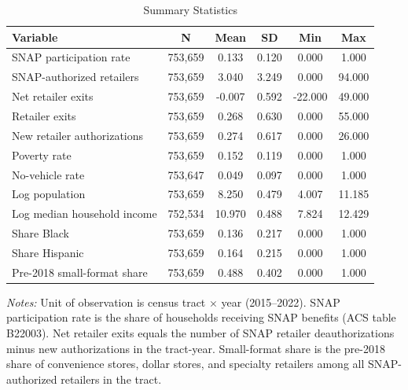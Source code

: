 \begin{table}[t]
\centering
\caption{Summary Statistics}
\label{tab:summary}
\begin{threeparttable}
\begin{tabular}{lccccc}
\toprule
Variable & N & Mean & SD & Min & Max \\
\midrule
  SNAP participation rate & 753,659 & 0.133 & 0.120 & 0.000 & 1.000 \\
  SNAP-authorized retailers & 753,659 & 3.040 & 3.249 & 0.000 & 94.000 \\
  Net retailer exits & 753,659 & -0.007 & 0.592 & -22.000 & 49.000 \\
  Retailer exits & 753,659 & 0.268 & 0.630 & 0.000 & 55.000 \\
  New retailer authorizations & 753,659 & 0.274 & 0.617 & 0.000 & 26.000 \\
  Poverty rate & 753,659 & 0.152 & 0.119 & 0.000 & 1.000 \\
  No-vehicle rate & 753,647 & 0.049 & 0.097 & 0.000 & 1.000 \\
  Log population & 753,659 & 8.250 & 0.479 & 4.007 & 11.185 \\
  Log median household income & 752,534 & 10.970 & 0.488 & 7.824 & 12.429 \\
  Share Black & 753,659 & 0.136 & 0.217 & 0.000 & 1.000 \\
  Share Hispanic & 753,659 & 0.164 & 0.215 & 0.000 & 1.000 \\
  Pre-2018 small-format share & 753,659 & 0.488 & 0.402 & 0.000 & 1.000 \\
\bottomrule
\end{tabular}
\begin{tablenotes}
\small
\item \textit{Notes:} Unit of observation is census tract $\times$ year (2015--2022). SNAP participation rate is the share of households receiving SNAP benefits (ACS table B22003). Net retailer exits equals the number of SNAP retailer deauthorizations minus new authorizations in the tract-year. Small-format share is the pre-2018 share of convenience stores, dollar stores, and specialty retailers among all SNAP-authorized retailers in the tract.
\end{tablenotes}
\end{threeparttable}
\end{table}
